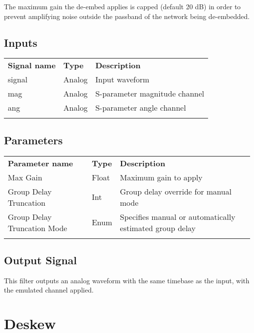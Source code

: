 The maximum gain the de-embed applies is capped (default 20 dB) in order to prevent amplifying noise outside the
passband of the network being de-embedded.

\subsection{Inputs}

\begin{tabularx}{16cm}{llX}
\thickhline
\textbf{Signal name} & \textbf{Type} & \textbf{Description} \\
\thickhline
signal & Analog & Input waveform \\
\thinhline
mag & Analog & S-parameter magnitude channel \\
\thinhline
ang & Analog & S-parameter angle channel \\
\thickhline
\end{tabularx}

\subsection{Parameters}

\begin{tabularx}{16cm}{llX}
\thickhline
\textbf{Parameter name} & \textbf{Type} & \textbf{Description} \\
\thickhline
Max Gain & Float & Maximum gain to apply\\
\thinhline
Group Delay Truncation & Int & Group delay override for manual mode\\
\thinhline
Group Delay Truncation Mode & Enum & Specifies manual or automatically estimated group delay\\
\thickhline
\end{tabularx}

\subsection{Output Signal}

This filter outputs an analog waveform with the same timebase as the input, with the emulated channel applied.

\pagebreak
\section{Deskew}
\label{filter:deskew}

